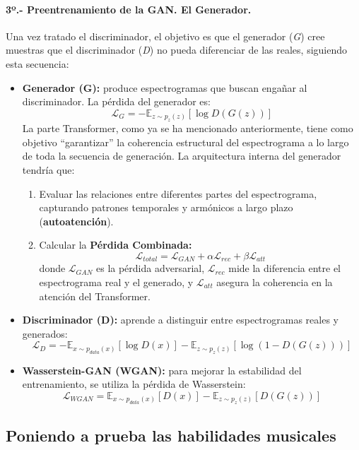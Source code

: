 \paragraph{3º.- Preentrenamiento de la GAN. El Generador.} 

Una vez tratado el discriminador, el objetivo es que el generador (\textit{G}) cree muestras que el discriminador (\textit{D}) no pueda diferenciar de las reales, siguiendo esta secuencia:

\begin{itemize}
    \item \textbf{Generador (G):} produce espectrogramas que buscan engañar al discriminador. La pérdida del generador es:
    \[
    \mathcal{L}_{G} = -\mathbb{E}_{z \sim p_z(z)}[\log D(G(z))]
    \]
    La parte Transformer, como ya se ha mencionado anteriormente, tiene como objetivo ``garantizar'' la coherencia estructural del espectrograma a lo largo de toda la secuencia de generación. La arquitectura interna del generador tendría que:
    \begin{enumerate}
        \item Evaluar las relaciones entre diferentes partes del espectrograma, capturando patrones temporales y armónicos a largo plazo (\textbf{autoatención}).
        \item  Calcular la \textbf{Pérdida Combinada:}
        \[
        \mathcal{L}_{total} = \mathcal{L}_{GAN} + \alpha \mathcal{L}_{rec} + \beta \mathcal{L}_{att}
        \]
        donde \( \mathcal{L}_{GAN} \) es la pérdida adversarial, \( \mathcal{L}_{rec} \) mide la diferencia entre el espectrograma real y el generado, y \( \mathcal{L}_{att} \) asegura la coherencia en la atención del Transformer.
    \end{enumerate}
    \item \textbf{Discriminador (D):} aprende a distinguir entre espectrogramas reales y generados:
    \[
    \mathcal{L}_{D} = -\mathbb{E}_{x \sim p_{data}(x)}[\log D(x)] - \mathbb{E}_{z \sim p_z(z)}[\log(1 - D(G(z)))]
    \]
    \item \textbf{Wasserstein-GAN (WGAN):} para mejorar la estabilidad del entrenamiento, se utiliza la pérdida de Wasserstein:
    \[
    \mathcal{L}_{WGAN} = \mathbb{E}_{x \sim p_{data}(x)}[D(x)] - \mathbb{E}_{z \sim p_z(z)}[D(G(z))]
    \]
\end{itemize}

\subsection{Poniendo a prueba las habilidades musicales}

